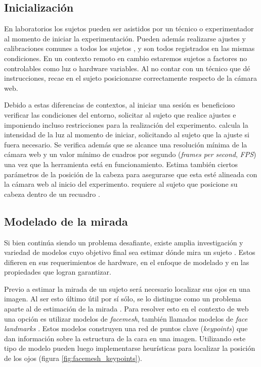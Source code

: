\subsection{Inicialización}

En laboratorios los sujetos pueden ser asistidos por un técnico o
experimentador al momento de iniciar la experimentación.
Pueden además realizarse ajustes y calibraciones comunes a todos los sujetos
\cite{hansen_2009_eye_of_the_beholder}, y son todos registrados en las mismas
condiciones.
En un contexto remoto en cambio estaremos sujetos a factores no controlables
como luz o hardware variables.
Al no contar con un técnico que dé instrucciones, recae en el sujeto
posicionarse correctamente respecto de la cámara web.

Debido a estas diferencias de contextos, al iniciar una sesión es beneficioso
verificar las condiciones del entorno, solicitar al sujeto que realice ajustes
e imponiendo incluso restricciones para la realización del experimento.
\turkergaze \cite{xu_2015_turker_gaze} calcula la intensidad de la luz al
momento de iniciar, solicitando al sujeto que la ajuste si fuera necesario.
Se verifica además que se alcance una resolución mínima de la cámara web y un
valor mínimo de cuadros por segundo (\textit{frames per second},
\textit{FPS}) una vez que la herramienta está en funcionamiento.
Estima también ciertos parámetros de la posición de la cabeza para asegurarse
que esta esté alineada con la cámara web al inicio del experimento.
\webgazer requiere al sujeto que posicione su cabeza dentro de un recuadro
\cite{papoutsaki_2016_webgazer}.

\subsection{Modelado de la mirada}

Si bien continúa siendo un problema desafiante, existe amplia investigación y
variedad de modelos cuyo objetivo final sea estimar dónde mira un sujeto
\cite{hansen_2009_eye_of_the_beholder}.
Estos difieren en sus requerimientos de hardware, en el enfoque de modelado y
en las propiedades que logran garantizar.

Previo a estimar la mirada de un sujeto será necesario localizar sus ojos en
una imagen.
Al ser esto último útil por sí sólo, se lo distingue como un problema aparte al
de estimación de la mirada \cite{hansen_2009_eye_of_the_beholder}.
Para resolver esto en el contexto de \eyetracking web una opción es utilizar
modelos de \textit{facemesh}, también llamados modelos de \textit{face
landmarks} \cite{papoutsaki_2016_webgazer}.
Estos modelos construyen una red de puntos clave (\textit{keypoints}) que dan
información sobre la estructura de la cara en una imagen.
Utilizando este tipo de modelo pueden luego implementarse heurísticas para
localizar la posición de los ojos (figura \ref{fig:facemesh_keypoints}).

